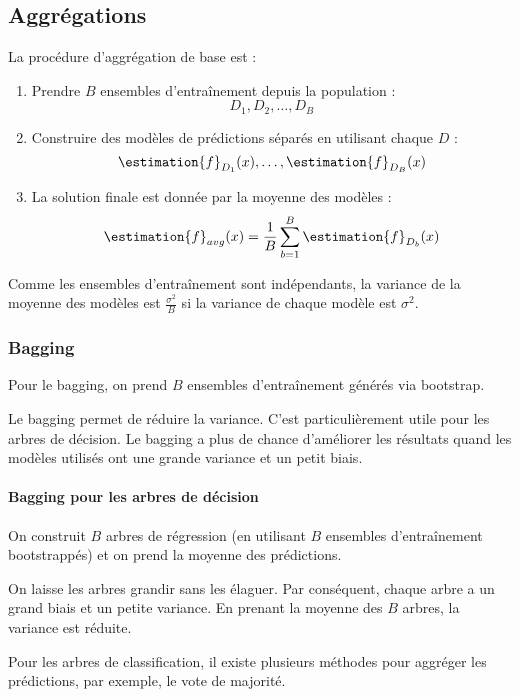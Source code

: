     \subsection{Aggrégations}
        La procédure d'aggrégation de base est :
        \begin{enumerate}
            \item Prendre \(B\) ensembles d'entraînement depuis la population :
            \[
                D_1, D_2, \dots, D_B
            \]
            \item Construire des modèles de prédictions séparés en utilisant chaque \(D\) :
            \[
                \estimation{f}_{D_1}(x), \dots, \estimation{f}_{D_B}(x)
            \]
            \item La solution finale est donnée par la moyenne des modèles :
            \[
                \estimation{f}_{avg}(x) = \frac{1}{B} \sum_{b = 1}^B \estimation{f}_{D_b} (x)
            \]
        \end{enumerate}

        Comme les ensembles d'entraînement sont indépendants, la variance de la moyenne des modèles est \(\frac{\sigma^2}{B}\) si la variance de chaque modèle est \(\sigma^2\).

        \subsubsection{Bagging}
            Pour le bagging, on prend \(B\) ensembles d'entraînement générés via bootstrap.

            Le bagging permet de réduire la variance. C'est particulièrement utile pour les arbres de décision. Le bagging a plus de chance d'améliorer les résultats quand les modèles utilisés ont une grande variance et un petit biais.

            \paragraph{Bagging pour les arbres de décision}
                On construit \(B\) arbres de régression (en utilisant \(B\) ensembles d'entraînement bootstrappés) et on prend la moyenne des prédictions.

                On laisse les arbres grandir sans les élaguer. Par conséquent, chaque arbre a un grand biais et un petite variance. En prenant la moyenne des \(B\) arbres, la variance est réduite.

                Pour les arbres de classification, il existe plusieurs méthodes pour aggréger les prédictions, par exemple, le vote de majorité.

